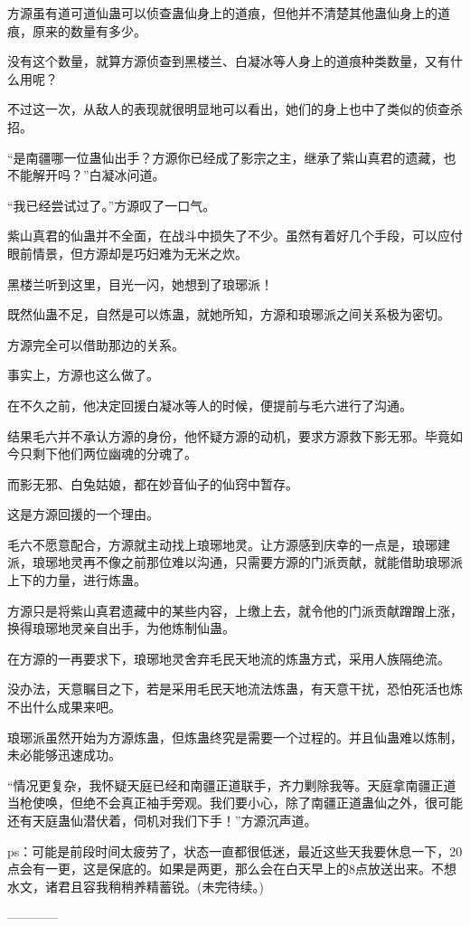 \begin{this_body}
方源虽有道可道仙蛊可以侦查蛊仙身上的道痕，但他并不清楚其他蛊仙身上的道痕，原来的数量有多少。

没有这个数量，就算方源侦查到黑楼兰、白凝冰等人身上的道痕种类数量，又有什么用呢？

不过这一次，从敌人的表现就很明显地可以看出，她们的身上也中了类似的侦查杀招。

“是南疆哪一位蛊仙出手？方源你已经成了影宗之主，继承了紫山真君的遗藏，也不能解开吗？”白凝冰问道。

“我已经尝试过了。”方源叹了一口气。

紫山真君的仙蛊并不全面，在战斗中损失了不少。虽然有着好几个手段，可以应付眼前情景，但方源却是巧妇难为无米之炊。

黑楼兰听到这里，目光一闪，她想到了琅琊派！

既然仙蛊不足，自然是可以炼蛊，就她所知，方源和琅琊派之间关系极为密切。

方源完全可以借助那边的关系。

事实上，方源也这么做了。

在不久之前，他决定回援白凝冰等人的时候，便提前与毛六进行了沟通。

结果毛六并不承认方源的身份，他怀疑方源的动机，要求方源救下影无邪。毕竟如今只剩下他们两位幽魂的分魂了。

而影无邪、白兔姑娘，都在妙音仙子的仙窍中暂存。

这是方源回援的一个理由。

毛六不愿意配合，方源就主动找上琅琊地灵。让方源感到庆幸的一点是，琅琊建派，琅琊地灵再不像之前那位难以沟通，只需要方源的门派贡献，就能借助琅琊派上下的力量，进行炼蛊。

方源只是将紫山真君遗藏中的某些内容，上缴上去，就令他的门派贡献蹭蹭上涨，换得琅琊地灵亲自出手，为他炼制仙蛊。

在方源的一再要求下，琅琊地灵舍弃毛民天地流的炼蛊方式，采用人族隔绝流。

没办法，天意瞩目之下，若是采用毛民天地流法炼蛊，有天意干扰，恐怕死活也炼不出什么成果来吧。

琅琊派虽然开始为方源炼蛊，但炼蛊终究是需要一个过程的。并且仙蛊难以炼制，未必能够迅速成功。

“情况更复杂，我怀疑天庭已经和南疆正道联手，齐力剿除我等。天庭拿南疆正道当枪使唤，但绝不会真正袖手旁观。我们要小心，除了南疆正道蛊仙之外，很可能还有天庭蛊仙潜伏着，伺机对我们下手！”方源沉声道。

ps：可能是前段时间太疲劳了，状态一直都很低迷，最近这些天我要休息一下，20点会有一更，这是保底的。如果是两更，那么会在白天早上的8点放送出来。不想水文，诸君且容我稍稍养精蓄锐。(未完待续。)

------------

\end{this_body}

